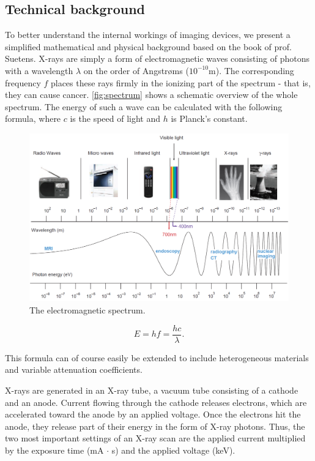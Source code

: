 \subsection{Technical background}
To better understand the internal workings of imaging devices, we present a
simplified mathematical and physical background based on the book of prof.
Suetens\cite{suetens}. X-rays are simply a form of electromagnetic waves
consisting of photons with a wavelength $\lambda$ on the order of Angstr\o ms
($10^{-10}$m). The corresponding frequency $f$ places these rays firmly in the
ionizing part of the spectrum - that is, they can cause cancer.
\autoref{fig:spectrum} shows a schematic overview of the whole spectrum. The
energy of such a wave can be calculated with the following formula, where $c$
is the speed of light and $h$ is Planck's constant.

\begin{figure}[ht]
\begin{center}
  \includegraphics[width=\linewidth]{img/spectrum.png}
  \caption{The electromagnetic spectrum. \cite{suetens}}
  \label{fig:spectrum}
\end{center}
\end{figure}

\begin{equation}
	E = hf = \frac{hc}{\lambda}.
\end{equation}

This formula can of course easily be extended to include heterogeneous materials
and variable attenuation coefficients.

X-rays are generated in an X-ray tube, a vacuum tube consisting of a cathode and
an anode. Current flowing through the cathode releases electrons,
which are accelerated toward the anode by an applied voltage. Once the electrons
hit the anode, they release part of their energy in the form of X-ray photons.
Thus, the two most important settings of an X-ray scan are the applied
current multiplied by the exposure time (mA $\cdot$ s) and the applied voltage
(keV).

